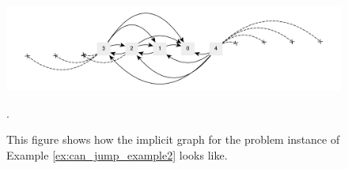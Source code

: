 \begin{figure}
	\centering
	\includegraphics[width=\textwidth]{sources/can_jump/images/example2}
	\caption[Implicit graph for the Example \ref{ex:can_jump_example2}.]
	{This figure shows how the implicit graph for the problem instance of Example \ref{ex:can_jump_example2} looks like.}.
	\label{fig:can_jump:example2}
\end{figure}


	

